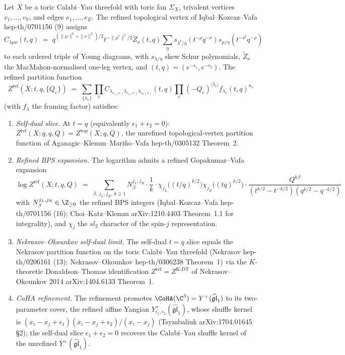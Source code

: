 \begin{theorem}
\label{thm:refined-topological-vertex}
Let $X$ be a toric Calabi--Yau threefold with toric fan $\Sigma_X$,
trivalent vertices $v_1, \ldots, v_V$, and edges $e_1, \ldots, e_E$.
The refined topological vertex of Iqbal--Kozcaz--Vafa
\textup{hep-th/0701156} (9) assigns
\[
 C_{\lambda \mu \nu}(t, q)
 \;=\;
 q^{(\|\mu\|^{2} + \|\nu\|^{2})/2} t^{-\|\mu^t\|^{2}/2}
 \widetilde{Z}_\nu(t, q)
 \sum_{\eta} s_{\lambda^t / \eta}(t^{-\rho} q^{-\nu})
 s_{\mu / \eta}(t^{-\nu^t} q^{-\rho})
\]
to each ordered triple of Young diagrams, with $s_{\lambda / \eta}$
skew Schur polynomials, $\widetilde{Z}_\nu$ the
MacMahon-normalised one-leg vertex, and $(t, q) = (e^{-\epsilon_1},
e^{-\epsilon_2})$. The refined partition function
\[
 Z^{\mathrm{ref}}(X; t, q, \{Q_e\})
 \;=\;
 \sum_{\{\lambda_e\}}
 \prod_v C_{\lambda_{e_1(v)} \lambda_{e_2(v)} \lambda_{e_3(v)}}(t, q)
 \prod_e (-Q_e)^{|\lambda_e|} f_{\lambda_e}(t, q)^{n_e}
\]
(with $f_\lambda$ the framing factor) satisfies:
\begin{enumerate}[label=\textup{(\roman*)}]
\item \emph{Self-dual slice.} At $t = q$ (equivalently $\epsilon_1 +
 \epsilon_2 = 0$): $Z^{\mathrm{ref}}(X; q, q, Q) = Z^{\mathrm{top}}(
 X; q, Q)$, the unrefined topological-vertex partition function of
 Aganagic--Klemm--Mari\~no--Vafa \textup{hep-th/0305132} Theorem~2.
\item \emph{Refined BPS expansion.} The logarithm admits a refined
 Gopakumar--Vafa expansion
 \[
 \log Z^{\mathrm{ref}}(X; t, q, Q)
 \;=\;
 \sum_{\beta,\, j_L, j_R,\, k \geq 1}
 N^{j_L, j_R}_\beta \cdot \frac{1}{k}
 \cdot \chi_{j_L}\!\bigl((t/q)^{k/2}\bigr) \chi_{j_R}\!\bigl((tq)^{k/2}\bigr)
 \cdot \frac{Q^{k\beta}}{(t^{k/2} - t^{-k/2})(q^{k/2} - q^{-k/2})}
 \]
 with $N^{j_L, j_R}_\beta \in \Z_{\geq 0}$ the refined BPS integers
 (Iqbal--Kozcaz--Vafa \textup{hep-th/0701156} (16);
 Choi--Katz--Klemm \textup{arXiv:1210.4403} Theorem~1.1 for
 integrality), and $\chi_j$ the $sl_2$ character of the spin-$j$
 representation.
\item \emph{Nekrasov--Okounkov self-dual limit.} The self-dual $t =
 q$ slice equals the Nekrasov partition function on the toric
 Calabi--Yau threefold (Nekrasov \textup{hep-th/0206161} (13);
 Nekrasov--Okounkov \textup{hep-th/0306238} Theorem~1) via the
 $K$-theoretic Donaldson--Thomas identification $Z^{\mathrm{ref}} =
 Z^{\mathrm{K\text{-}DT}}$ of Nekrasov--Okounkov 2014
 \textup{arXiv:1404.6133} Theorem~1.
\item \emph{CoHA refinement.} The refinement promotes
 $\CoHA(\C^{3}) = Y^{+}(\widehat{\mathfrak{gl}}_1)$ to its
 two-parameter cover, the refined affine Yangian
 $Y^{+}_{\epsilon_1, \epsilon_2}(\widehat{\mathfrak{gl}}_1)$, whose
 shuffle kernel is $(x_i - x_j + \epsilon_1)(x_i - x_j + \epsilon_2)
 / (x_i - x_j)$ (Tsymbaliuk \textup{arXiv:1704.01645} \S2); the
 self-dual slice $\epsilon_1 + \epsilon_2 = 0$ recovers the
 Calabi--Yau shuffle kernel of the unrefined
 $Y^+(\widehat{\mathfrak{gl}}_1)$.
\end{enumerate}
\end{theorem}

